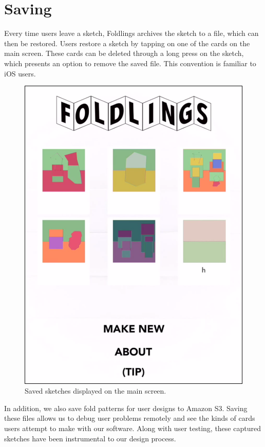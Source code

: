\section{Saving}\label{saving}

Every time users leave a sketch, Foldlings archives the sketch to a
file, which can then be restored. Users restore a sketch by tapping on
one of the cards on the main screen. These cards can be deleted through
a long press on the sketch, which presents an option to remove the saved
file. This convention is familiar to iOS users.

\begin{figure}[htbp]
\centering
\includegraphics{figures/34_UI_Saving/saved_sketches.png}
\caption{Saved sketches displayed on the main screen.}
\end{figure}

In addition, we also save fold patterns for user designs to Amazon S3.
Saving these files allows us to debug user problems remotely and see the
kinds of cards users attempt to make with our software. Along with user
testing, these captured sketches have been instrumental to our design
process.
